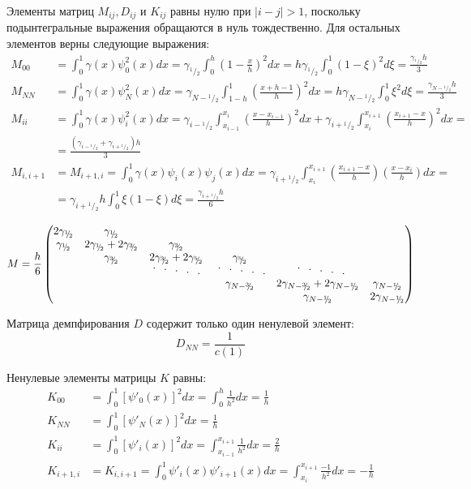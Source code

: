 \documentclass[12pt]{article}
\newcommand{\cutefrac}[2]{{}^{#1\!}\!/{\!}_#2}
\newcommand{\half}{\cutefrac{1}{2}}
\newcommand{\cuteddots}{
\text{
\raisebox{.6ex}{$\cdot$}\hspace{.75em}%
\raisebox{.3ex}{$\cdot$}\hspace{.75em}%
$\cdot$\hspace{.75em}%
\raisebox{-.3ex}{$\cdot$}\hspace{.75em}%
\raisebox{-.6ex}{$\cdot$}%
}}
\begin{document}
Элементы матриц $M_{ij}, D_{ij}$ и $K_{ij}$ равны нулю при $|i - j| > 1$, 
поскольку подынтегральные выражения обращаются в нуль тождественно. Для
остальных элементов верны следующие выражения:
\begin{align*}
M_{00} &= \int_0^1 \gamma(x) \psi_0^2(x) dx = \gamma_{\half}\int_0^h
\left(1-\frac{x}{h}\right)^2 dx = h \gamma_{\half} \int_0^1 (1-\xi)^2 d\xi =
\frac{\gamma_{\half}h}{3}\\
M_{NN} &= \int_0^1 \gamma(x) \psi_N^2(x) dx = \gamma_{N - \half}\int_{1-h}^1
\left(\frac{x + h - 1}{h}\right)^2 dx = h \gamma_{N - \half} \int_0^1 \xi^2 d\xi =
\frac{\gamma_{N - \half}h}{3}\\
M_{ii} &= \int_0^1 \gamma(x) \psi_i^2(x) dx = 
\gamma_{i - \half}\int_{x_{i-1}}^{x_i} \left(\frac{x - x_{i-1}}{h}\right)^2 dx +
\gamma_{i + \half}\int_{x_i}^{x_{i+1}} \left(\frac{x_{i+1} - x}{h}\right)^2 dx =\\ 
&= \frac{(\gamma_{i-\half} + \gamma_{i+\half})h}{3}\\
M_{i,i+1} &= M_{i+1,i} = \int_0^1 \gamma(x) \psi_i(x) \psi_j(x) dx = 
\gamma_{i + \half}\int_{x_i}^{x_{i+1}} 
\left(\frac{x_{i+1} - x}{h}\right)\left(\frac{x - x_i}{h}\right) dx =\\
&= 
\gamma_{i+\half} h \int_0^1 \xi(1-\xi) d\xi = \frac{\gamma_{i+\half}h}{6}
\end{align*}

\[
M = \frac{h}{6}
\begin{pmatrix}
2\gamma_{\half} & \gamma_{\half} & \\
\gamma_{\half} & 2\gamma_{\half} + 2\gamma_{\cutefrac{3}{2}} & \gamma_{\cutefrac{3}{2}}\\
& \gamma_{\cutefrac{3}{2}} & 2\gamma_{\cutefrac{3}{2}} + 2\gamma_{\cutefrac{5}{2}} & \gamma_{\cutefrac{5}{2}}\\
& & \cuteddots\; & \cuteddots & \;\cuteddots \\
& & & \gamma_{N - \cutefrac{3}{2}} & 2\gamma_{N - \cutefrac{3}{2}} + 2\gamma_{N
- \half} & \gamma_{N-\half}\\
& & & & \gamma_{N - \half} & 2\gamma_{N-\half}
\end{pmatrix}
\]

Матрица демпфирования $D$ содержит только один ненулевой элемент:
\[
D_{NN} = \frac{1}{c(1)}
\]

Ненулевые элементы матрицы $K$ равны:
\begin{align*}
K_{00} &= \int_0^1 \left[\psi'_0(x)\right]^2 dx = \int_0^h \frac{1}{h^2} dx =
\frac{1}{h}\\
K_{NN} &= \int_0^1 \left[\psi'_N(x)\right]^2 dx = \frac{1}{h}\\
K_{ii} &= \int_0^1 \left[\psi'_i(x)\right]^2 dx = 
\int_{x_{i-1}}^{x_{i+1}} \frac{1}{h^2} dx = \frac{2}{h}\\
K_{i+1,i} &= K_{i,i+1} = \int_0^1 \psi'_{i}(x) \psi'_{i+1}(x) dx =
\int_{x_i}^{x_{i+1}} \frac{-1}{h^2} dx = -\frac{1}{h}
\end{align*}
\end{document}
